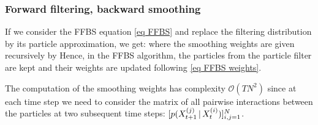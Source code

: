 \subsubsection{Forward filtering, backward smoothing}
If we consider the FFBS equation \eqref{eq FFBS} and replace the filtering distribution by its particle approximation, we get:
where the smoothing weights are given recursively by
Hence, in the FFBS algorithm, the particles from the particle filter are kept and their weights are updated following \eqref{eq FFBS weights}. 

The computation of the smoothing weights has complexity $\mathcal O(TN^{2})$ since at each time step we need to consider the matrix of all pairwise interactions between the particles at two subsequent time steps: $[p(X^{(j)}_{t+1}\,|\, X^{(i)}_{t})]_{i,j=1}^{N}$.

